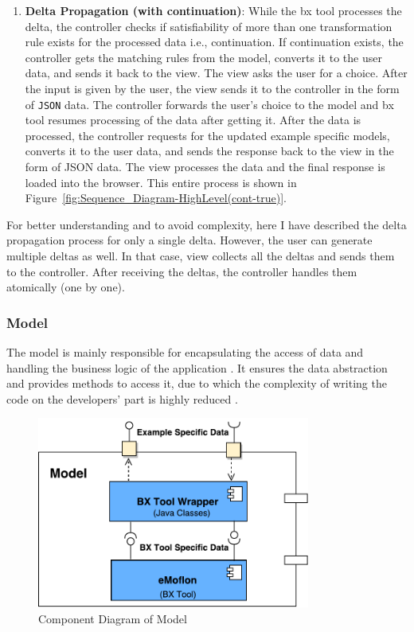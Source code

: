 \begin{enumerate}
    \item {\textbf{Delta Propagation (with continuation)}: While the bx tool processes the delta, the controller checks if satisfiability of more than one transformation rule exists for the processed data i.e., continuation. If continuation exists, the controller gets the matching rules from the model, converts it to the user data, and sends it back to the view. The view asks the user for a choice. After the input is given by the user, the view sends it to the controller in the form of \texttt{JSON} data. The controller forwards the user's choice to the model and bx tool resumes processing of the data after getting it. After the data is processed, 
    the controller requests for the updated example specific models, converts it to the user data, and sends the response back to the view in the form of JSON data. The view processes the data and the final response is loaded into the browser. This entire process is shown in Figure~\ref{fig:Sequence_Diagram-HighLevel(cont-true)}.}
\end{enumerate}

For better understanding and to avoid complexity, here I have described the delta propagation process for only a single delta. However, the user can generate multiple deltas as well. In that case, view collects all the deltas and sends them to the controller. After receiving the deltas, the controller handles them atomically (one by one).

\subsubsection{Model}\label{subsubsec:design_model}
The model is mainly responsible for encapsulating the access of data and handling the business logic of the application \cite{designpattern-headfirst} \cite{mvc-arch}. It ensures the data abstraction and provides methods to access it, due to which the complexity of writing the code on the developers' part is highly reduced \cite{mdd-webwithmvc}.

\begin{figure}
	\centering
	\includegraphics[width=0.8\textwidth]{figures/Component_Diagram-Model}
	\caption{Component Diagram of Model}
	\label{fig:Component_Diagram-Model}
\end{figure}

